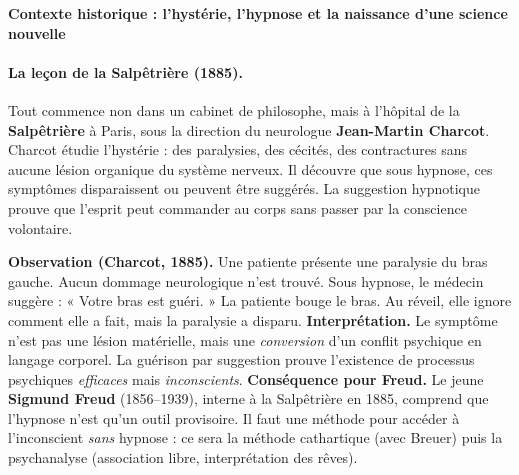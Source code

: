 \documentclass[11pt]{article}
\newcommand{\cle}[1]{{\popxbold\color{popdark}#1}}
\begin{document}
\textbf{Contexte historique : l'hystérie, l'hypnose et la naissance d'une science nouvelle}\par

\paragraph{La leçon de la Salpêtrière (1885).} Tout commence non dans un cabinet de philosophe, mais à l'hôpital de la \textbf{Salpêtrière} à Paris, sous la direction du neurologue \textbf{Jean-Martin Charcot}. Charcot étudie l'\cle{hystérie} : des paralysies, des cécités, des contractures sans aucune lésion organique du système nerveux. Il découvre que sous \cle{hypnose}, ces symptômes disparaissent ou peuvent être suggérés. La suggestion hypnotique prouve que l'esprit peut commander au corps sans passer par la conscience volontaire.

\begin{experience}
\textbf{Observation (Charcot, 1885).} Une patiente présente une paralysie du bras gauche. Aucun dommage neurologique n'est trouvé. Sous hypnose, le médecin suggère : « Votre bras est guéri. » La patiente bouge le bras. Au réveil, elle ignore comment elle a fait, mais la paralysie a disparu.
\textbf{Interprétation.} Le symptôme n'est pas une lésion matérielle, mais une \emph{conversion} d'un conflit psychique en langage corporel. La guérison par suggestion prouve l'existence de processus psychiques \emph{efficaces} mais \emph{inconscients}.
\textbf{Conséquence pour Freud.} Le jeune \textbf{Sigmund Freud} (1856–1939), interne à la Salpêtrière en 1885, comprend que l'hypnose n'est qu'un outil provisoire. Il faut une méthode pour accéder à l'inconscient \emph{sans} hypnose : ce sera la \cle{méthode cathartique} (avec Breuer) puis la \cle{psychanalyse} (association libre, interprétation des rêves).
\end{experience}
\end{document}
